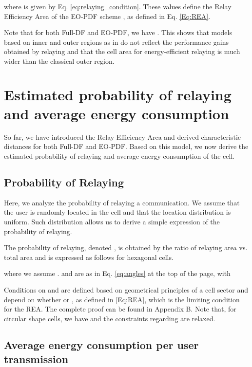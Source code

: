 \documentclass[journal]{IEEEtran}
\theoremstyle{definition}
\begin{document}
where  is given by Eq. \eqref{eq:relaying_condition}. These values define the Relay Efficiency Area of the EO-PDF scheme , as defined in Eq. \eqref{Eq:REA}.

Note that for both Full-DF and EO-PDF, we have
. This shows that models based on inner and outer regions as in \cite{Chandwani2010}
do not reflect the performance gains obtained by relaying and that the cell area for energy-efficient relaying is much wider than the classical outer region.



\section{Estimated probability of relaying and average energy consumption}
\label{sec:P_RTx_energy}

So far, we have introduced the Relay Efficiency Area and derived characteristic distances for both Full-DF and EO-PDF. Based on this model, we now derive the estimated probability of relaying and average energy consumption of the cell. 


\subsection{Probability of Relaying}

Here, we analyze the probability of relaying a communication. We assume that the user is randomly located in the cell and that the location distribution is uniform. Such distribution allows us to derive a simple expression of the probability of relaying.

The probability of relaying, denoted , is obtained by the ratio of relaying area vs. total area and is expressed as follows for hexagonal cells.

where we assume .  and  are as in Eq. \eqref{eq:angles} at the top of the page, with 
\addtocounter{equation}{1}


Conditions on  and  are defined based on geometrical principles of a cell sector and depend on whether  or , as defined in \eqref{Eq:REA}, which is the limiting condition for the REA. The complete proof can be found in Appendix B. Note that, for circular shape cells, we have  and the constraints regarding  are relaxed.

 

\subsection{Average energy consumption per user transmission}
\end{document}
